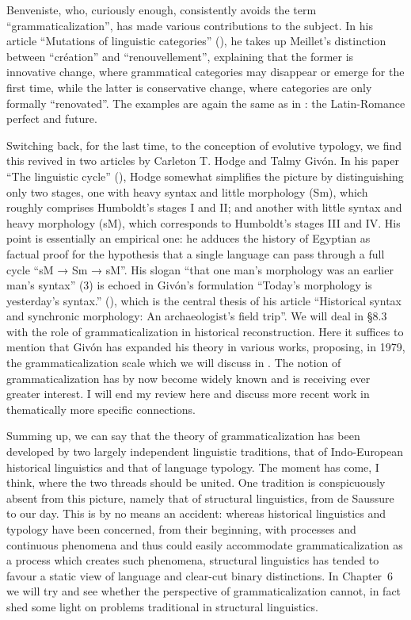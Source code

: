 Benveniste, who, curiously enough, consistently avoids the term ``grammaticalization'', has made various contributions to the subject. In his article “Mutations of linguistic categories” (\citeyear{Benveniste1968}), he takes up Meillet's distinction between “création” and “renouvellement”, explaining that the former is innovative change, where grammatical categories may disappear or emerge for the first time, while the latter is conservative change, where categories are only formally ``renovated''. The examples are again the same as in \citet{Meillet1912}: the Latin-Romance perfect and future.

Switching back, for the last time, to the conception of evolutive typology, we find this revived in two articles by Carleton T. Hodge and Talmy Givón. In his paper “The linguistic cycle” (\citeyear{Hodge1970}), Hodge somewhat simplifies the picture by distinguishing only two stages, one with heavy syntax and little morphology (Sm), which roughly comprises Humboldt's stages I and II; and another with little syntax and heavy morphology (sM), which corresponds to Humboldt's stages III and IV. His point is essentially an empirical one: he adduces the history of Egyptian as factual proof for the hypothesis that a single language can pass through a full cycle ``sM → Sm → sM''. His slogan “that one man's morphology was an earlier man's syntax” (3) is echoed in Givón's formulation “Today's morphology is yesterday's syntax.” (\citeyear[413]{Givón1971}), which is the central thesis of his article “Historical syntax and synchronic morphology: An archaeologist's field trip”. We will deal in §8.3 with the role of grammaticalization in historical reconstruction. Here it suffices to mention that Givón has expanded his theory in various works, proposing, in 1979, the grammaticalization scale which we will discuss in . The notion of grammaticalization has by now become widely known and is receiving ever greater interest. I will end my review here and discuss more recent work in thematically more specific connections.

Summing up, we can say that the theory of grammaticalization has been developed by two largely independent linguistic traditions, that of Indo-European historical linguistics and that of language typology. The moment has come, I think, where the two threads should be united. One tradition is conspicuously absent from this picture, namely that of structural linguistics, from de Saussure to our day. This is by no means an accident: whereas historical linguistics and typology have been concerned, from their beginning, with processes and continuous phenomena and thus could easily accommodate grammaticalization as a process which creates such phenomena, structural linguistics has tended to favour a static view of language and clear-cut binary distinctions. In Chapter~6 we will try and see whether the perspective of grammaticalization cannot, in fact shed some light on problems traditional in structural linguistics.
